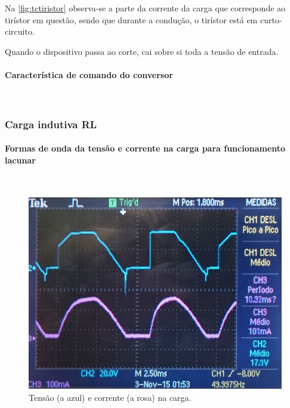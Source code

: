 \documentclass[a4paper,11pt]{article}
\numberwithin{equation}{section}
\begin{document}
Na \autoref{fig:tctiristor} observa-se a parte da corrente da carga que corresponde ao tirístor em questão, sendo que durante a condução, o tirístor está em curto-circuito.

Quando o dispositivo passa ao corte, cai sobre si toda a tensão de entrada.

\paragraph{Característica de comando do conversor} \mbox{}\

\subsubsection{Carga indutiva RL}

\paragraph{Formas de onda da tensão e corrente na carga para funcionamento lacunar} \mbox{}\

\begin{figure}[H]
	\centering
	\includegraphics[keepaspectratio=true, scale=0.15]{img/DSC_0184}
	\caption{Tensão (a azul) e corrente (a rosa) na carga.}
	\label{fig:tcentradalacuna}
	\vspace{-0.8em}
\end{figure}


\end{document}
